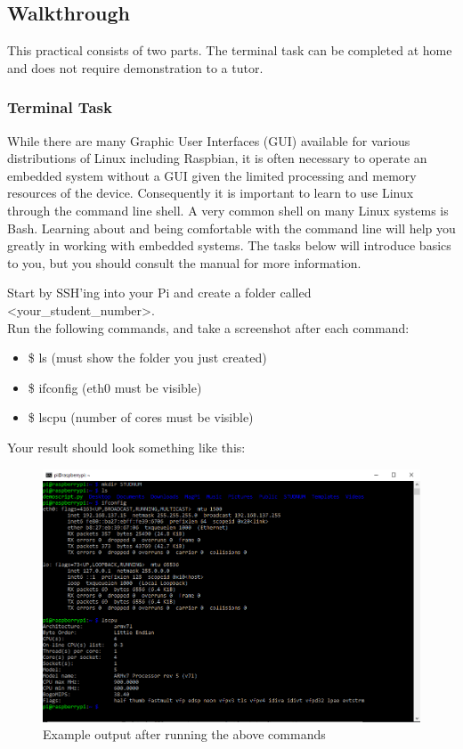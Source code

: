 \subsection{Walkthrough}
This practical consists of two parts. The terminal task can be completed at home and does not require demonstration to a tutor.

\subsubsection{Terminal Task}
\label{sec:Prac1:Terminal}
While there are many Graphic User Interfaces (GUI) available for various distributions of Linux including Raspbian, it is often necessary to operate an embedded system without a GUI given the limited processing and memory resources of the device.  Consequently it is important to learn to use Linux through the command line shell. A very common shell on many Linux systems is Bash.  Learning about and being comfortable with the command line will help you greatly in working with embedded systems.  The tasks below will introduce basics to you, but you should consult the manual for more information.

Start by SSH'ing into your Pi and create a folder called \textless your\_student\_number\textgreater.\\
Run the following commands, and take a screenshot after each command:
\begin{itemize}
\itemsep0em 
    \item \$ ls (must show the folder you just created)
    \item \$ ifconfig (eth0 must be visible)
    \item \$ lscpu (number of cores must be visible)
\end{itemize}
Your result should look something like this:
\begin{figure}[H]
\centering
\includegraphics[width=0.6\columnwidth]{Figures/CMDOutput}
\caption{Example output after running the above commands}
\label{fig:CMDOutput}
\end{figure}



